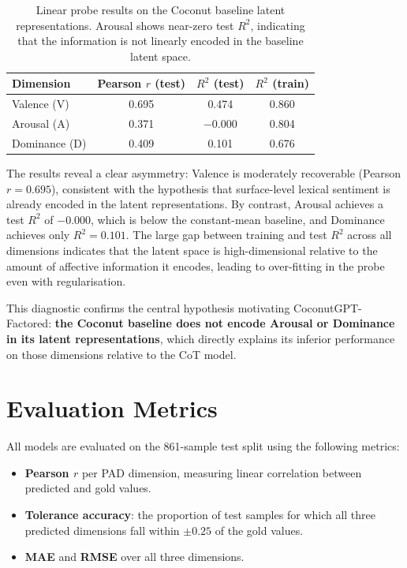 \documentclass[12pt,twoside]{report}
\begin{document}
\begin{table}[H]
\centering
\begin{tabular}{lccc}
\toprule
\textbf{Dimension} & \textbf{Pearson $r$ (test)} & \textbf{$R^2$ (test)} & \textbf{$R^2$ (train)} \\
\midrule
Valence (V)   & 0.695 & \phantom{$-$}0.474 & 0.860 \\
Arousal (A)   & 0.371 & $-$0.000 & 0.804 \\
Dominance (D) & 0.409 & \phantom{$-$}0.101 & 0.676 \\
\bottomrule
\end{tabular}
\caption{Linear probe results on the Coconut baseline latent representations. Arousal shows near-zero test $R^2$, indicating that the information is not linearly encoded in the baseline latent space.}
\label{tab:probe_baseline}
\end{table}

The results reveal a clear asymmetry: Valence is moderately recoverable (Pearson $r = 0.695$), consistent with the hypothesis that surface-level lexical sentiment is already encoded in the latent representations.
By contrast, Arousal achieves a test $R^2$ of $-0.000$, which is below the constant-mean baseline, and Dominance achieves only $R^2 = 0.101$.
The large gap between training and test $R^2$ across all dimensions indicates that the latent space is high-dimensional relative to the amount of affective information it encodes, leading to over-fitting in the probe even with regularisation.

This diagnostic confirms the central hypothesis motivating CoconutGPT-Factored: \textbf{the Coconut baseline does not encode Arousal or Dominance in its latent representations}, which directly explains its inferior performance on those dimensions relative to the CoT model.

\section{Evaluation Metrics}

All models are evaluated on the 861-sample test split using the following metrics:

\begin{itemize}
    \item \textbf{Pearson $r$} per PAD dimension, measuring linear correlation between predicted and gold values.
    \item \textbf{Tolerance accuracy}: the proportion of test samples for which all three predicted dimensions fall within $\pm 0.25$ of the gold values.
    \item \textbf{MAE} and \textbf{RMSE} over all three dimensions.
\end{itemize}
\end{document}
